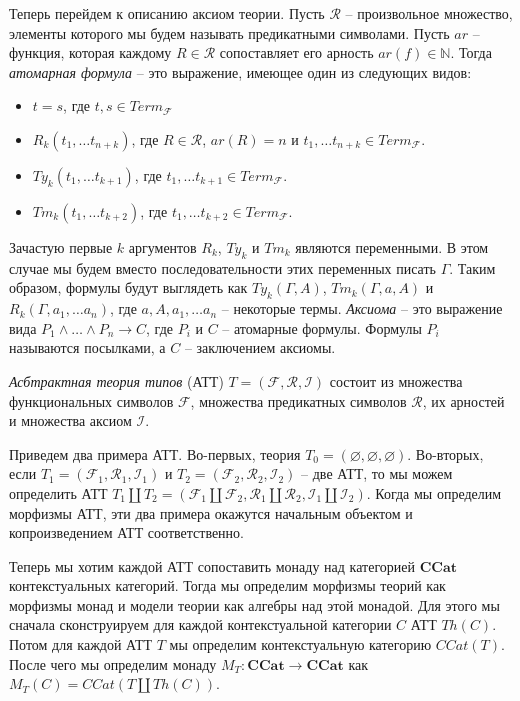 \documentclass{amsart}
\theoremstyle{definition}
\theoremstyle{remark}
\newcommand{\cat}[1]{\mathbf{#1}}
\newcommand{\ccat}{\cat{CCat}}
\numberwithin{figure}{section}
\begin{document}
Теперь перейдем к описанию аксиом теории.
Пусть $\mathcal{R}$ -- произвольное множество, элементы которого мы будем называть предикатными символами.
Пусть $ar$ -- функция, которая каждому $R \in \mathcal{R}$ сопоставляет его арность $ar(f) \in \mathbb{N}$.
Тогда \emph{атомарная формула} -- это выражение, имеющее один из следующих видов:
\begin{itemize}
\item $t = s$, где $t, s \in Term_\mathcal{F}$
\item $R_k(t_1, \ldots t_{n+k})$, где $R \in \mathcal{R}$, $ar(R) = n$ и $t_1, \ldots t_{n+k} \in Term_\mathcal{F}$.
\item $Ty_k(t_1, \ldots t_{k+1})$, где $t_1, \ldots t_{k+1} \in Term_\mathcal{F}$.
\item $Tm_k(t_1, \ldots t_{k+2})$, где $t_1, \ldots t_{k+2} \in Term_\mathcal{F}$.
\end{itemize}
Зачастую первые $k$ аргументов $R_k$, $Ty_k$ и $Tm_k$ являются переменными.
В этом случае мы будем вместо последовательности этих переменных писать $\Gamma$.
Таким образом, формулы будут выглядеть как $Ty_k(\Gamma, A)$, $Tm_k(\Gamma, a, A)$ и $R_k(\Gamma, a_1, \ldots a_n)$, где $a, A, a_1, \ldots a_n$ -- некоторые термы.
\emph{Аксиома} -- это выражение вида $P_1 \land \ldots \land P_n \to C$, где $P_i$ и $C$ -- атомарные формулы.
Формулы $P_i$ называются посылками, а $C$ -- заключением аксиомы.

\begin{defn}
\emph{Асбтрактная теория типов} (АТТ) $T = (\mathcal{F}, \mathcal{R}, \mathcal{I})$ состоит из множества функциональных символов $\mathcal{F}$, множества предикатных символов $\mathcal{R}$, их арностей и множества аксиом $\mathcal{I}$.
\end{defn}

Приведем два примера АТТ.
Во-первых, теория $T_0 = (\varnothing, \varnothing, \varnothing)$.
Во-вторых, если $T_1 = (\mathcal{F}_1, \mathcal{R}_1, \mathcal{I}_1)$ и $T_2 = (\mathcal{F}_2, \mathcal{R}_2, \mathcal{I}_2)$ -- две АТТ,
то мы можем определить АТТ $T_1 \amalg T_2 = (\mathcal{F}_1 \amalg \mathcal{F}_2, \mathcal{R}_1 \amalg \mathcal{R}_2, \mathcal{I}_1 \amalg \mathcal{I}_2)$.
Когда мы определим морфизмы АТТ, эти два примера окажутся начальным объектом и копроизведением АТТ соответственно.

Теперь мы хотим каждой АТТ сопоставить монаду над категорией $\ccat$ контекстуальных категорий.
Тогда мы определим морфизмы теорий как морфизмы монад и модели теории как алгебры над этой монадой.
Для этого мы сначала сконструируем для каждой контекстуальной категории $C$ АТТ $Th(C)$.
Потом для каждой АТТ $T$ мы определим контекстуальную категорию $CCat(T)$.
После чего мы определим монаду $M_T : \ccat \to \ccat$ как $M_T(C) = CCat(T \amalg Th(C))$.
\end{document}
